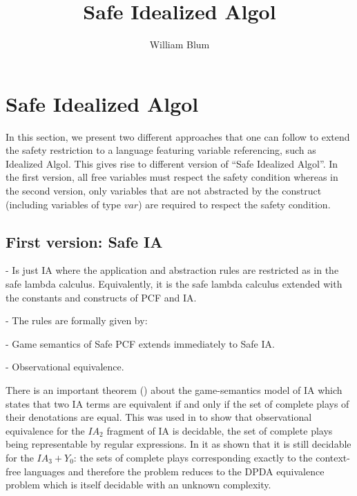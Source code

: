 



\author{William Blum}
\title{Safe Idealized Algol}


\maketitle

\section{Safe Idealized Algol}

In this section, we present two different approaches that one can
follow to extend the safety restriction to a language featuring
variable referencing, such as Idealized Algol. This gives rise to
different version of ``Safe Idealized Algol''. In the first version,
all free variables must respect the safety condition whereas in the
second version, only variables that are not abstracted by the \ianew
construct (including variables of type $var$) are required to
respect the safety condition.


\subsection{First version: Safe IA}
- Is just IA where the application and abstraction rules are
restricted as in the safe lambda calculus. Equivalently, it is the
safe lambda calculus extended with the constants and constructs of
PCF and IA.

- The rules are formally given by:


- Game semantics of Safe PCF extends immediately to Safe IA.

- Observational equivalence.

There is an important theorem (\cite{AM97a}) about the
game-semantics model of IA which states that two IA terms are
equivalent if and only if the set of complete plays of their
denotations are equal. This was used in \cite{ghicamccusker00} to
show that observational equivalence for the $IA_2$ fragment of IA is
decidable, the set of complete plays being representable by regular
expressions. In \cite{Ong02} it as shown that it is still decidable
 for the $IA_3+Y_0$: the sets of complete plays corresponding exactly to the context-free languages
 and therefore the problem reduces to the DPDA equivalence problem which is itself decidable with an unknown
complexity.

